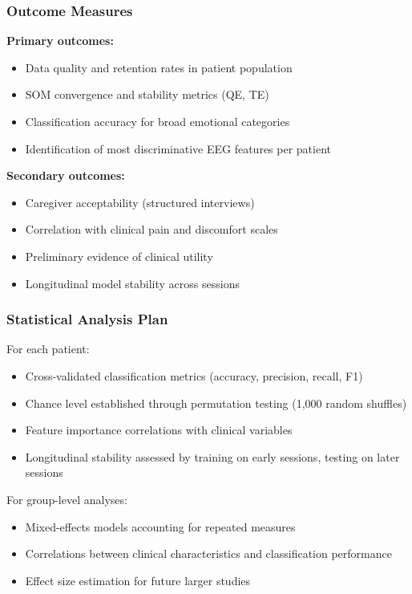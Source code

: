 \subsubsection{Outcome Measures}

\textbf{Primary outcomes:}
\begin{itemize}
    \item Data quality and retention rates in patient population
    \item SOM convergence and stability metrics (QE, TE)
    \item Classification accuracy for broad emotional categories
    \item Identification of most discriminative EEG features per patient
\end{itemize}

\textbf{Secondary outcomes:}
\begin{itemize}
    \item Caregiver acceptability (structured interviews)
    \item Correlation with clinical pain and discomfort scales
    \item Preliminary evidence of clinical utility
    \item Longitudinal model stability across sessions
\end{itemize}

\subsubsection{Statistical Analysis Plan}

For each patient:
\begin{itemize}
    \item Cross-validated classification metrics (accuracy, precision, recall, F1)
    \item Chance level established through permutation testing (1,000 random shuffles)
    \item Feature importance correlations with clinical variables
    \item Longitudinal stability assessed by training on early sessions, testing on later sessions
\end{itemize}

For group-level analyses:
\begin{itemize}
    \item Mixed-effects models accounting for repeated measures
    \item Correlations between clinical characteristics and classification performance
    \item Effect size estimation for future larger studies
\end{itemize}